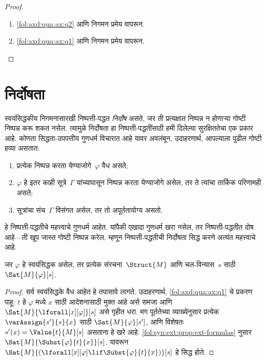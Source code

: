 \begin{proof}
\begin{enumerate}
\item \ref{fol:axd:qua:ax:q2} आणि निगमन प्रमेय वापरून.
\item \ref{fol:axd:qua:ax:q1} आणि निगमन प्रमेय वापरून.
\end{enumerate}
\end{proof}












\section{निर्दोषता}\label{fol:axd:sou:sec}

\begin{explain}
स्वयंसिद्धकीय निगमनासारखी निष्पत्ती-पद्धत
\emph{निर्दोष} असते, जर ती प्रत्यक्षात निष्पन्न न होणाऱ्या गोष्टी
निष्पन्न करू शकत नसेल. त्यामुळे निर्दोषता हा निष्पत्ती-पद्धतींसाठी
हमी दिलेल्या सुरक्षिततेचा एक प्रकार आहे. कोणता सिद्धता-उपपत्तीय गुणधर्म
विचारात आहे यावर अवलंबून, उदाहरणार्थ, आपल्याला पुढील गोष्टी हव्या असतात:
\begin{enumerate}
\item प्रत्येक निष्पन्न करता येण्याजोगे~$\varphi$ वैध असते;
\item $\varphi$ हे इतर काही सूत्रे~$\Gamma$ यांच्यापासून निष्पन्न करता येण्याजोगे असेल,
  तर ते त्यांचा तार्किक परिणामही असते;
\item सूत्रांचा संच~$\Gamma$ विसंगत असेल, तर तो अपूर्ततायोग्य असतो.
\end{enumerate}
हे निष्पत्ती-पद्धतीचे महत्त्वाचे गुणधर्म आहेत. यांपैकी एखादा गुणधर्म
खरा नसेल, तर निष्पत्ती-पद्धतीत दोष आहे---ती खूप जास्त गोष्टी
निष्पन्न करेल. म्हणून निष्पत्ती-पद्धतीची निर्दोषता सिद्ध करणे अत्यंत
महत्त्वाचे आहे.
\end{explain}

\begin{prop}
  जर $\varphi$ हे स्वयंसिद्धक असेल, तर
  प्रत्येक संरचना~$\Struct{M}$ आणि चल-विन्यास~$s$ साठी $\Sat{M}{\varphi}[s]$.
\end{prop}

\begin{proof}
सर्व स्वयंसिद्धके वैध आहेत हे तपासावे लागते. उदाहरणार्थ,
  \ref{fol:axd:qua:ax:q1} चे प्रकरण पाहू: $t$ हे $\varphi$ मध्ये $x$ साठी
  आदेशनासाठी मुक्त आहे असे समजा आणि
  $\Sat{M}{\lforall[x][\varphi]}[s]$ असे गृहीत धरा. मग पूर्ततेच्या व्याख्येनुसार
  प्रत्येक $\varAssign{s'}{s}{x}$ साठी $\Sat{M}{\varphi}[s']$, आणि विशेषतः
  $s'(x) = \Value{t}{M}[s]$ असताना हे खरे आहे.
  \ref{fol:syn:ext:prop:ext-formulas} नुसार
  $\Sat{M}{\Subst{\varphi}{t}{x}}[s]$. यावरून
  $\Sat{M}{(\lforall[x][\varphi] \lif \Subst{\varphi}{t}{x})}[s]$ हे सिद्ध होते.
\end{proof}

